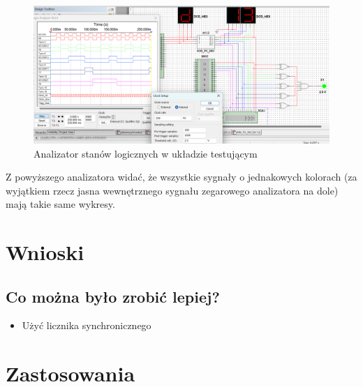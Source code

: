 \documentclass{article}
\begin{document}
    \begin{figure}[H]
        \centering
        \captionsetup{font=small, skip=2pt}
        \includegraphics[scale=0.5]{images/analizator_test}
        \caption{Analizator stanów logicznych w układzie testującym}
    \end{figure}
    Z powyższego analizatora widać, że wszystkie sygnały o jednakowych kolorach (za wyjątkiem rzecz jasna
    wewnętrznego sygnału zegarowego analizatora na dole) mają takie same wykresy. 

    \section{Wnioski}
    
    \subsection*{Co można było zrobić lepiej?}
    \begin{itemize}
        \item Użyć licznika synchronicznego
    \end{itemize}

    \section{Zastosowania}
\end{document}
